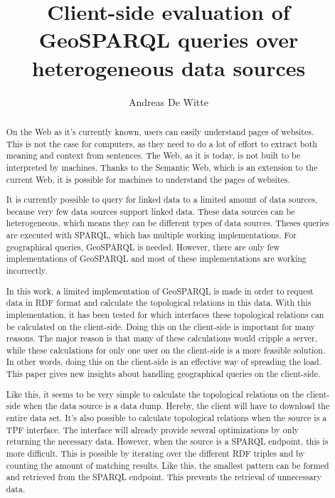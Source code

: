 \documentclass[twocolumn]{phdsymp} %
\begin{document}
\title{Client-side evaluation of GeoSPARQL queries over heterogeneous data sources} %

\author{Andreas De Witte}


\maketitle

\begin{abstract}
    On the Web as it's currently known, users can easily understand pages of websites. This is not the case for computers, as they need to do a lot of effort to extract both meaning and context from sentences. The Web, as it is today, is not built to be interpreted by machines. Thanks to the Semantic Web, which is an extension to the current Web, it is possible for machines to understand the pages of websites.

    It is currently possible to query for linked data to a limited amount of data sources, because very few data sources support linked data. These data sources can be heterogeneous, which means they can be different types of data sources. Theses queries are executed with SPARQL, which has multiple working implementations. For geographical queries, GeoSPARQL is needed. However, there are only few implementations of GeoSPARQL and most of these implementations are working incorrectly.

    In this work, a limited implementation of GeoSPARQL is made in order to request data in RDF format and calculate the topological relations in this data. With this implementation, it has been tested for which interfaces these topological relations can be calculated on the client-side. Doing this on the client-side is important for many reasons. The major reason is that many of these calculations would cripple a server, while these calculations for only one user on the client-side is a more feasible solution. In other words, doing this on the client-side is an effective way of spreading the load. This paper gives new insights about handling geographical queries on the client-side.

    Like this, it seems to be very simple to calculate the topological relations on the client-side when the data source is a data dump. Hereby, the client will have to download the entire data set. It's also possible to calculate topological relations when the source is a TPF interface. The interface will already provide several optimizations by only returning the necessary data. However, when the source is a SPARQL endpoint, this is more difficult. This is possible by iterating over the different RDF triples and by counting the amount of matching results. Like this, the smallest pattern can be formed and retrieved from the SPARQL endpoint. This prevents the retrieval of unnecessary data.
    

\end{abstract}
\end{document}
